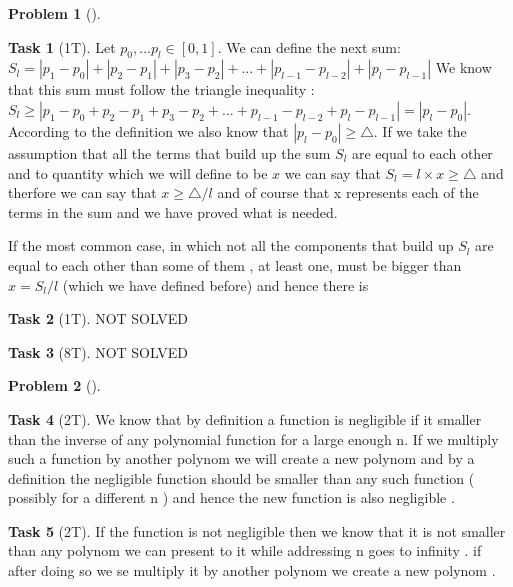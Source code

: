 \documentclass[11pt,twoside]{article}
\theoremstyle{definition}
\newtheorem{amsproblem}{Problem}
\newtheorem{amssubproblem}{Task}[amsproblem]
\newenvironment{problem}[1][]{%
  \begin{amsproblem}[#1]
  }{%
  \end{amsproblem}
}
\newenvironment{subproblem}[1][]{%
  \begin{amssubproblem}[#1]
  }{%
  \end{amssubproblem}
}
\newcommand{\TP}[1]{#1T}
\begin{document}
\begin{problem}
  \begin{subproblem}[\TP{1}]
    Let   $p_{0},...p_{l}\in [0,1]$.  
    We can define the next sum: \newline $S_{l}=\left|p_{1}-p_{0}\right|+\left|p_{2}-p_{1}\right|+\left|p_{3}-p_{2}\right|+...+\left|p_{l-1}-p_{l-2}\right|+\left|p_{l}-p_{l-1}\right|$ \newline
    We know that this sum must follow the triangle inequality :\newline
    $S_{l}\geq \left|p_{1}-p_{0}+p_{2}-p_{1}+p_{3}-p_{2}+...+p_{l-1}-p_{l-2}+p_{l}-p_{l-1}\right|=\left| p_{l}-p_{0}\right|$.\newline
    According to the definition we also know that $\left| p_{l}-p_{0}\right|\geq \triangle$.\newline
    If we take the assumption that all the terms that build up the sum $S_{l}$ are equal to each other and to  quantity which we will define to be $x$ we can say that $S_{l}=l\times x\geq \triangle$ and therfore we can say that $x\geq\triangle/l$ and of course that x represents each of the terms in the sum and we have proved what is needed.\newline 
    
    If the most common case, in which not all the components that build up $S_{l}$ are equal to each other than some of them , at least one, must be bigger than $x=S_{l}/l$ (which we have defined before) and hence there is   

  \end{subproblem}
  \begin{subproblem}[\TP{1}]
    NOT SOLVED %
  \end{subproblem}
  \begin{subproblem}[\TP{8}]
    NOT SOLVED %
  \end{subproblem}
\end{problem}

\noindent
\hrulefill

\begin{problem}
  \begin{subproblem}[\TP{2}]
    We know that by definition a function is negligible if it  smaller than the inverse of any polynomial function for a large enough n. If we multiply such a function by another polynom we will create a new polynom and by a definition the negligible function should be smaller than any such function ( possibly for a different n ) and hence the new function is also negligible .  %
  \end{subproblem}
  \begin{subproblem}[\TP{2}]
    If the function is not negligible then we know that  it is not smaller than any polynom we can present to it while addressing n goes to infinity . if after doing so we se multiply it by another polynom we create a new polynom .%
  \end{subproblem}
\end{problem}
\end{document}
